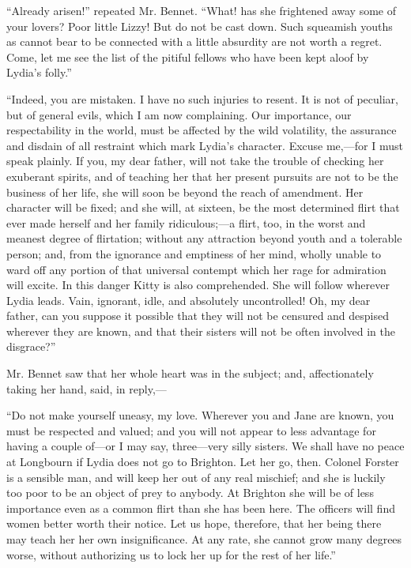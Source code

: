 \documentclass[12pt]{book}
\begin{document}
``Already arisen!'' repeated Mr. Bennet. ``What! has she frightened away some of your lovers? Poor little Lizzy! But do not be cast down. Such squeamish youths as cannot bear to be connected with a little absurdity are not worth a regret. Come, let me see the list of the pitiful fellows who have been kept aloof by Lydia's folly.''

``Indeed, you are mistaken. I have no such injuries to resent. It is not of peculiar, but of general evils, which I am now complaining. Our importance, our respectability in the world, must be affected by the wild volatility, the assurance and disdain of all restraint which mark Lydia's character. Excuse me,---for I must speak plainly. If you, my dear father, will not take the trouble of checking her exuberant spirits, and of teaching her that her present pursuits are not to be the business of her life, she will soon be beyond the reach of amendment. Her character will be fixed; and she will, at sixteen, be the most determined flirt that ever made herself and her family ridiculous;---a flirt, too, in the worst and meanest degree of flirtation; without any attraction beyond youth and a tolerable person; and, from the ignorance and emptiness of her mind, wholly unable to ward off any portion of that universal contempt which her rage for admiration will excite. In this danger Kitty is also comprehended. She will follow wherever Lydia leads. Vain, ignorant, idle, and absolutely uncontrolled! Oh, my dear father, can you suppose it possible that they will not be censured and despised wherever they are known, and that their sisters will not be often involved in the disgrace?''

Mr. Bennet saw that her whole heart was in the subject; and, affectionately taking her hand, said, in reply,---

``Do not make yourself uneasy, my love. Wherever you and Jane are known, you must be respected and valued; and you will not appear to less advantage for having a couple of---or I may say, three---very silly sisters. We shall have no peace at Longbourn if Lydia does not go to Brighton. Let her go, then. Colonel Forster is a sensible man, and will keep her out of any real mischief; and she is luckily too poor to be an object of prey to anybody. At Brighton she will be of less importance even as a common flirt than she has been here. The officers will find women better worth their notice. Let us hope, therefore, that her being there may teach her her own insignificance. At any rate, she cannot grow many degrees worse, without authorizing us to lock her up for the rest of her life.''
\end{document}
